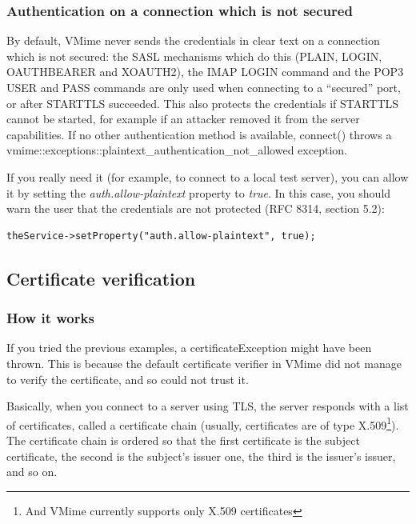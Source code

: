 
\subsubsection{Authentication on a connection which is not secured\label{net-plaintext-auth}} %

By default, VMime never sends the credentials in clear text on a connection
which is not secured: the SASL mechanisms which do this (PLAIN, LOGIN,
OAUTHBEARER and XOAUTH2), the IMAP {\vcode LOGIN} command and the POP3
{\vcode USER} and
{\vcode PASS} commands are only used when connecting to a ``secured'' port,
or after STARTTLS succeeded. This also protects the credentials if STARTTLS
cannot be started, for example if an attacker removed it from the server
capabilities. If no other authentication method is available,
{\vcode connect()} throws a
{\vcode vmime::exceptions::plaintext\_authentication\_not\_allowed}
exception.

If you really need it (for example, to connect to a local test server), you
can allow it by setting the \emph{auth.allow-plaintext} property to
\emph{true}. In this case, you should warn the user that the credentials are
not protected (RFC 8314, section 5.2):

\begin{lstlisting}
theService->setProperty("auth.allow-plaintext", true);
\end{lstlisting}

\subsection{Certificate verification} %

\subsubsection{How it works} %

If you tried the previous examples, a
{\vcode certificateException} might have been thrown.
This is because the default certificate verifier in VMime did not manage to
verify the certificate, and so could not trust it.

Basically, when you connect to a server using TLS, the server responds with
a list of certificates, called a certificate chain (usually, certificates are
of type X.509\footnote{And VMime currently supports only X.509 certificates}).
The certificate chain is ordered so that the first certificate is the subject
certificate, the second is the subject's issuer one, the third is the issuer's
issuer, and so on.

